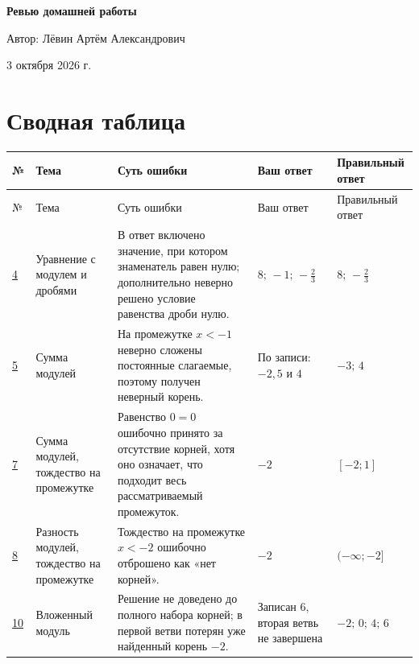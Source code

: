 \documentclass[12pt,a4paper]{article}
\begin{document}
\hypersetup{pageanchor=false}
\begin{titlepage}
\centering
\vspace*{0.22\textheight}
{\LARGE\bfseries Ревью домашней работы\par}
\vspace{1.6cm}
{\large Автор: Лёвин Артём Александрович\par}
\vspace{0.5cm}
{\large 3 октября 2026 г.\par}
\vfill
{}
\end{titlepage}
\hypersetup{pageanchor=true}

\newpage
\section*{Сводная таблица}
\small
\begin{longtable}{>{\centering\arraybackslash}p{0.8cm} p{3.0cm} p{5.0cm} p{2.6cm} p{2.9cm}}
\toprule
№ & Тема & Суть ошибки & Ваш ответ & Правильный ответ \\
\midrule
\endfirsthead
\toprule
№ & Тема & Суть ошибки & Ваш ответ & Правильный ответ \\
\midrule
\endhead
\hyperref[task:4]{4} & Уравнение с модулем и дробями & В ответ включено значение, при котором знаменатель равен нулю; дополнительно неверно решено условие равенства дроби нулю. & $8;\,-1;\,-\frac23$ & $8;\,-\frac23$ \\
\addlinespace
\hyperref[task:5]{5} & Сумма модулей & На промежутке $x<-1$ неверно сложены постоянные слагаемые, поэтому получен неверный корень. & По записи: $-2{,}5$ и $4$ & $-3;\,4$ \\
\addlinespace
\hyperref[task:7]{7} & Сумма модулей, тождество на промежутке & Равенство $0=0$ ошибочно принято за отсутствие корней, хотя оно означает, что подходит весь рассматриваемый промежуток. & $-2$ & $[-2;1]$ \\
\addlinespace
\hyperref[task:8]{8} & Разность модулей, тождество на промежутке & Тождество на промежутке $x<-2$ ошибочно отброшено как «нет корней». & $-2$ & $(-\infty;-2]$ \\
\addlinespace
\hyperref[task:10]{10} & Вложенный модуль & Решение не доведено до полного набора корней; в первой ветви потерян уже найденный корень $-2$. & Записан $6$, вторая ветвь не завершена & $-2;\,0;\,4;\,6$ \\
\bottomrule
\end{longtable}
\normalsize
\end{document}
